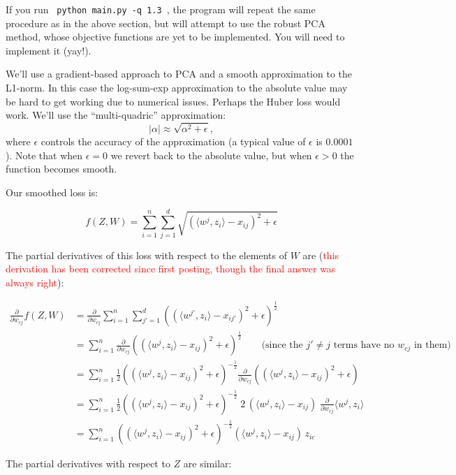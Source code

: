 \documentclass{article}
\newcommand{\red}[1]{\textcolor{red}{#1}}
\let\update\red
\begin{document}
If you run \verb| python main.py -q 1.3 |, the program will repeat the same procedure as in the above section, but will attempt to use the robust PCA method, whose objective functions are yet to be implemented. You will need to implement it (yay!).

We'll use a gradient-based approach to PCA and a smooth approximation to the L1-norm. In this case the log-sum-exp approximation to the absolute value may be hard to get working due to numerical issues. Perhaps the Huber loss would work. We'll use the ``multi-quadric'' approximation:
\[
|\alpha| \approx \sqrt{\alpha^2 + \epsilon},
\]
where $\epsilon$ controls the accuracy of the approximation (a typical value of $\epsilon$ is $0.0001$). Note that when $\epsilon=0$ we revert back to the absolute value, but when $\epsilon>0$ the function becomes smooth.

Our smoothed loss is:

\[
f(Z,W) = \sum_{i=1}^n\sum_{j=1}^d \sqrt{(\langle w^j, z_i\rangle - x_{ij})^2 + \epsilon }
\]

The partial derivatives of this loss with respect to the elements of $W$ are
(\update{this derivation has been corrected since first posting, though the final answer was always right}):

\begin{align*}
\frac{\partial}{\partial w_{cj}} f(Z,W)
  &= \frac{\partial}{\partial w_{cj}} \sum_{i=1}^n\sum_{j'=1}^d \left( (\langle w^{j'}, z_i\rangle - x_{ij'})^2 + \epsilon \right)^{\frac12} \\
  &= \sum_{i=1}^n \frac{\partial}{\partial w_{cj}} \left( (\langle w^{j}, z_i\rangle - x_{ij})^2 + \epsilon \right)^{\frac12}  \qquad \text{(since the $j' \ne j$ terms have no $w_{cj}$ in them)} \\
  &= \sum_{i=1}^n \frac12 \left( (\langle w^{j}, z_i\rangle - x_{ij})^2 + \epsilon \right)^{-\frac12} \frac{\partial}{\partial w_{cj}} \left( (\langle w^{j}, z_i\rangle - x_{ij})^2 + \epsilon \right) \\
  &= \sum_{i=1}^n \frac12  \left( (\langle w^{j}, z_i\rangle - x_{ij})^2 + \epsilon \right)^{-\frac12} \;2\,  (\langle w^{j}, z_i\rangle - x_{ij}) \; \frac{\partial}{\partial w_{cj}} \langle w^{j}, z_i\rangle \\
  &= \sum_{i=1}^n \left( (\langle w^{j}, z_i\rangle - x_{ij})^2 + \epsilon \right)^{-\frac12}  (\langle w^j, z_i\rangle - x_{ij}) \, z_{ic}
\end{align*}

The partial derivatives with respect to $Z$ are similar:
\end{document}
